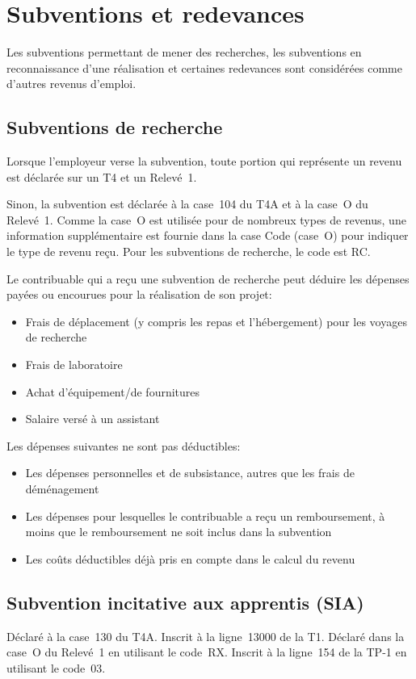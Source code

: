 \section{Subventions et redevances}
\begin{intro}
	Les subventions permettant de mener des recherches, les subventions en reconnaissance d'une réalisation et certaines redevances sont considérées comme d'autres revenus d'emploi.
\end{intro}


\subsection{Subventions de recherche}
Lorsque l'employeur verse la subvention, toute portion qui représente un revenu est déclarée sur un T4 et un Relevé~1.

Sinon, la subvention est déclarée à la case~104 du T4A et à la case~O du Relevé~1. Comme la case~O est utilisée pour de nombreux types de revenus, une information supplémentaire est fournie dans la case Code (case~O) pour indiquer le type de revenu reçu. Pour les subventions de recherche, le code est RC. 

Le contribuable qui a reçu une subvention de recherche peut déduire les dépenses payées ou encourues pour la réalisation de son projet:
\begin{itemize}
	\item Frais de déplacement (y compris les repas et l'hébergement) pour les voyages de recherche
	\item Frais de laboratoire
	\item Achat d'équipement/de fournitures
	\item Salaire versé à un assistant
\end{itemize}

Les dépenses suivantes ne sont pas déductibles:
\begin{itemize}
	\item Les dépenses personnelles et de subsistance, autres que les frais de déménagement
	\item Les dépenses pour lesquelles le contribuable a reçu un remboursement, à moins que le remboursement ne soit inclus dans la subvention
	\item Les coûts déductibles déjà pris en compte dans le calcul du revenu
\end{itemize}



\subsection{Subvention incitative aux apprentis (SIA)}
Déclaré à la case~130 du T4A. Inscrit à la ligne~13000 de la T1. Déclaré dans la case~O du Relevé~1 en utilisant le code~RX. Inscrit à la ligne~154 de la TP-1 en utilisant le code~03.


